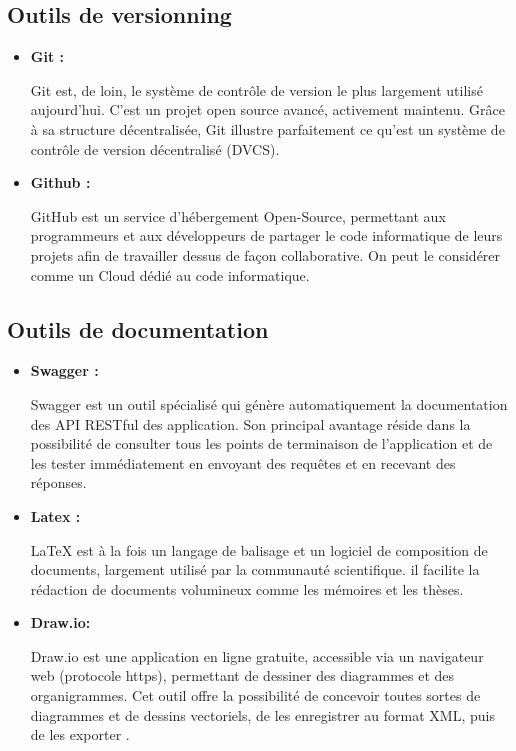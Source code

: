     \subsection{Outils de versionning}
    \begin{itemize}
        \item \textbf{Git : }
                    \par Git est, de loin, le système de contrôle de version le plus largement utilisé aujourd'hui. C'est un projet open source avancé, activement maintenu. 
                     Grâce à sa structure décentralisée, Git illustre parfaitement ce qu'est un système de contrôle de version décentralisé (DVCS)\cite{git}.
        \item\textbf{Github :}
                \par GitHub est un service d'hébergement Open-Source, permettant aux programmeurs et aux développeurs de partager le code informatique de leurs projets afin de travailler dessus de façon collaborative. On peut le considérer comme un Cloud dédié au code informatique\cite{github}.
        \end{itemize}
    \subsection{Outils de documentation}
        \begin{itemize}
            \item\textbf{Swagger : }
                        \par Swagger est un outil spécialisé qui génère automatiquement la documentation des API RESTful des application.  
                        Son principal avantage réside dans la possibilité de consulter tous les points de terminaison de l'application et de les tester immédiatement en envoyant des requêtes et en recevant des réponses\cite{swagger}.
            \item\textbf{Latex :}

                    \par LaTeX est à la fois un langage de balisage et un logiciel de composition de documents,
                     largement utilisé par la communauté scientifique.
                      il facilite la rédaction de documents volumineux comme les mémoires et les thèses\cite{latex}.
            \item\textbf{Draw.io:}
                    \par Draw.io est une application en ligne gratuite, accessible via un navigateur web (protocole https), permettant de dessiner des diagrammes et des organigrammes. 
                    Cet outil offre la possibilité de concevoir toutes sortes de diagrammes et de dessins vectoriels, de les enregistrer au format XML, puis de les exporter \cite{draw}.
            \end{itemize}
